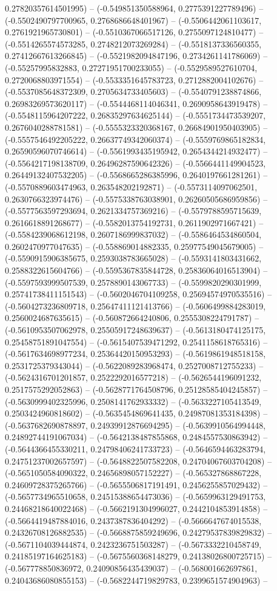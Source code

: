0.27820357614501995) -- (-0.549851350588964, 0.2775391227789496) -- (-0.5502490797700965, 0.2768686648401967) -- (-0.5506442061103617, 0.2761921965730801) -- (-0.5510367066517126, 0.2755097124810477) -- (-0.5514265574573285, 0.2748212073269284) -- (-0.5518137336560355, 0.27412667613266845) -- (-0.5521982094847196, 0.2734261141786069) -- (-0.55257995832883, 0.27271951700233055) -- (-0.5529589527610704, 0.2720068803971554) -- (-0.5533351645783723, 0.2712882004102676) -- (-0.5537085648372309, 0.2705634733405603) -- (-0.5540791238874866, 0.26983269573620117) -- (-0.5544468114046341, 0.2690958643919478) -- (-0.5548115964207222, 0.26835297634625144) -- (-0.5551734473539207, 0.2676040288781581) -- (-0.5555323320368167, 0.26684901950403905) -- (-0.5557546492205222, 0.26637749342060374) -- (-0.5559769865182834, 0.26590596070746614) -- (-0.5561993435195942, 0.2654344214932477) -- (-0.5564217198138709, 0.26496287590642326) -- (-0.5566441149904523, 0.26449132407532205) -- (-0.5568665286385996, 0.2640197661281261) -- (-0.5570889603474963, 0.263548202192871) -- (-0.5573114097062501, 0.2630766323974476) -- (-0.5575338763038901, 0.26260505686959856) -- (-0.5577563597293694, 0.2621334757369216) -- (-0.5579788595715639, 0.2616618891268677) -- (-0.5582013754192731, 0.2611902971667421) -- (-0.5584239068612198, 0.2607186999837032) -- (-0.5586464534860504, 0.2602470977047635) -- (-0.558869014882335, 0.25977549045679005) -- (-0.5590915906385675, 0.2593038783665028) -- (-0.5593141803431662, 0.2588322615604766) -- (-0.5595367835844728, 0.25836064016513904) -- (-0.5597593999507539, 0.2578890143067733) -- (-0.5599820290301999, 0.25741738411151543) -- (-0.5602046704109258, 0.25694574970535516) -- (-0.5604273236809718, 0.25647411121413766) -- (-0.5606499884283019, 0.2560024687635615) -- (-0.560872664240806, 0.2555308224791787) -- (-0.5610953507062978, 0.25505917248639637) -- (-0.5613180474125175, 0.25458751891047554) -- (-0.5615407539471292, 0.2541158618765316) -- (-0.5617634698977234, 0.25364420150953293) -- (-0.5619861948518158, 0.2531725379343044) -- (-0.5622089283968474, 0.2527008712755233) -- (-0.5624316701201857, 0.2522292016577218) -- (-0.5626544196091232, 0.2517575292052863) -- (-0.5628771764508796, 0.25128585404245857) -- (-0.5630999402325996, 0.2508141762933332) -- (-0.5633227105413549, 0.2503424960818602) -- (-0.5635454869641435, 0.24987081353184398) -- (-0.5637682690878897, 0.24939912876694295) -- (-0.5639910564994448, 0.24892744191067034) -- (-0.5642138487855868, 0.2484557530863942) -- (-0.5644366455330211, 0.24798406241733723) -- (-0.5646594463283794, 0.24751237002657597) -- (-0.5648822507582208, 0.24704067603704208) -- (-0.5651050584090322, 0.24656898057152227) -- (-0.565327868867228, 0.24609728375265766) -- (-0.5655506817191491, 0.2456255857029432) -- (-0.5657734965510658, 0.24515388654473036) -- (-0.5659963129491753, 0.24468218640022468) -- (-0.5662191304996027, 0.2442104853914858) -- (-0.5664419487884016, 0.2437387836404292) -- (-0.5666647674015538, 0.24326708126882535) -- (-0.5668875859249696, 0.24279537839829832) -- (-0.5671104039444874, 0.2423236751503287) -- (-0.5673332210458749, 0.24185197164625183) -- (-0.5675560368148279, 0.24138026800725715) -- (-0.567778850836972, 0.24090856435439037) -- (-0.568001662697861, 0.24043686080855153) -- (-0.5682244719829783, 0.2399651574904963) -- 